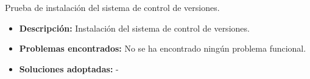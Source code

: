 \item Prueba de instalación del sistema de control de versiones.
  \begin{itemize}
    \item \textbf{Descripción:} Instalación del sistema de control de versiones.
    \item \textbf{Problemas encontrados:} No se ha encontrado ningún problema
    funcional.
    \item \textbf{Soluciones adoptadas:} -
  \end{itemize}

